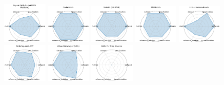 \begin{figure}[ht!]
\centering
\includegraphics[width=0.1900\textwidth]{images/papers_with_code_sota_platform_radar.pdf}
\includegraphics[width=0.1900\textwidth]{images/codabench_radar.pdf}
\includegraphics[width=0.1900\textwidth]{images/sabath_sbi-fair_radar.pdf}
\includegraphics[width=0.1900\textwidth]{images/pdebench_radar.pdf}
\includegraphics[width=0.1900\textwidth]{images/llm-inference-bench_radar.pdf}
\\[1ex]
\includegraphics[width=0.1900\textwidth]{images/delta_squared-dft_radar.pdf}
\includegraphics[width=0.1900\textwidth]{images/urban_data_layer_udl_radar.pdf}
\includegraphics[width=0.1900\textwidth]{images/llms_for_crop_science_radar.pdf}

\end{figure}
